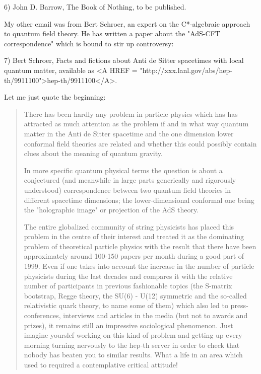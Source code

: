 6) John D. Barrow, The Book of Nothing, to be published.

My other email was from Bert Schroer, an expert on the C*-algebraic 
approach to quantum field theory.  He has written a paper about the
"AdS-CFT correspondence" which is bound to stir up controversy:

7) Bert Schroer, Facts and fictions about Anti de Sitter spacetimes
with local quantum matter, available as <A HREF = "http://xxx.lanl.gov/abs/hep-th/9911100">hep-th/9911100</A>.

Let me just quote the beginning:

\begin{quote}
      There has been hardly any problem in particle physics which has
      has attracted as much attention as the problem if and in what way
      quantum matter in the Anti de Sitter spacetime and the one dimension
      lower conformal field theories are related and whether this could
      possibly contain clues about the meaning of quantum gravity.

      In more specific quantum physical terms the question is about
      a conjectured (and meanwhile in large parts generically and 
      rigorously understood) correspondence between two quantum field 
      theories in different spacetime dimensions; the lower-dimensional
      conformal one being the "holographic image" or projection 
      of the AdS theory.
     
      The entire globalized community of string physicists has placed
      this problem in the centre of their interest and treated it as
      the dominating problem of theoretical particle physics with the
      result that there have been approximately around 100-150 papers
      per month during a good part of 1999.  Even if one takes into 
      account the increase in the number of particle physicists during
      the last decades and compares it with the relative number of
      participants in previous fashionable topics (the S-matrix bootstrap,
      Regge theory, the SU(6) - U(12) symmetric and the so-called
      relativistic quark theory, to name some of them) which also led
      to press-conferences, interviews and articles in the media (but
      not to awards and prizes), it remains still an impressive sociological
      phenomenon.  Just imagine yourslef working on this kind of problem
      and getting up every morning turning nervously to the hep-th server 
      in order to check that nobody has beaten you to similar results.  
      What a life in an area which used to required a contemplative 
      critical attitude!
  

\end{quote}
